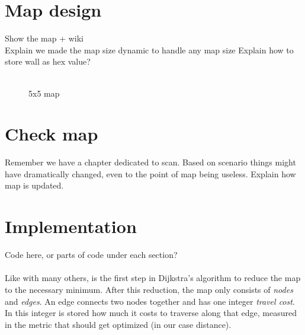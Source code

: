 \section{Map design}
\label{sec:map_design} %
Show the map + wiki\\
Explain we made the map size dynamic to handle any map size
Explain how to store wall as hex value?\\
\\
\begin{figure}[htp]
    \centering
    \caption{5x5 map}
    \label{fig:5x5map}
\end{figure}

\section{Check map}
\label{sec:map_check} %
Remember we have a chapter dedicated to scan.\linebreak
Based on scenario things might have dramatically changed, even to the point of map being useless. Explain how map is updated.

\section{Implementation}
\label{sec:map} %
Code here, or parts of code under each section?\\
\\
Like with many others,
is the first step in Dijkstra's algorithm to reduce the map to the necessary minimum.
After this reduction, the map only consists of \emph{nodes} and \emph{edges}.
An edge connects two nodes together and has one integer \emph{travel cost}.
In this integer is stored how much it costs to traverse along that edge,
measured in the metric that should get optimized (in our case distance).


